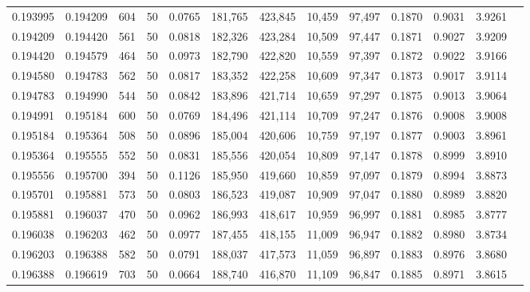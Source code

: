 \begin{tabular}{rrrrrrrrrrrrr}
0.193995 & 0.194209 &   604 &  50 &                                     0.0765 & 181,765 & 423,845 &  10,459 &  97,497 & 0.1870 & 0.9031 & 3.9261 \\
0.194209 & 0.194420 &   561 &  50 &                                     0.0818 & 182,326 & 423,284 &  10,509 &  97,447 & 0.1871 & 0.9027 & 3.9209 \\
0.194420 & 0.194579 &   464 &  50 &                                     0.0973 & 182,790 & 422,820 &  10,559 &  97,397 & 0.1872 & 0.9022 & 3.9166 \\
0.194580 & 0.194783 &   562 &  50 &                                     0.0817 & 183,352 & 422,258 &  10,609 &  97,347 & 0.1873 & 0.9017 & 3.9114 \\
0.194783 & 0.194990 &   544 &  50 &                                     0.0842 & 183,896 & 421,714 &  10,659 &  97,297 & 0.1875 & 0.9013 & 3.9064 \\
0.194991 & 0.195184 &   600 &  50 &                                     0.0769 & 184,496 & 421,114 &  10,709 &  97,247 & 0.1876 & 0.9008 & 3.9008 \\
0.195184 & 0.195364 &   508 &  50 &                                     0.0896 & 185,004 & 420,606 &  10,759 &  97,197 & 0.1877 & 0.9003 & 3.8961 \\
0.195364 & 0.195555 &   552 &  50 &                                     0.0831 & 185,556 & 420,054 &  10,809 &  97,147 & 0.1878 & 0.8999 & 3.8910 \\
0.195556 & 0.195700 &   394 &  50 &                                     0.1126 & 185,950 & 419,660 &  10,859 &  97,097 & 0.1879 & 0.8994 & 3.8873 \\
0.195701 & 0.195881 &   573 &  50 &                                     0.0803 & 186,523 & 419,087 &  10,909 &  97,047 & 0.1880 & 0.8989 & 3.8820 \\
0.195881 & 0.196037 &   470 &  50 &                                     0.0962 & 186,993 & 418,617 &  10,959 &  96,997 & 0.1881 & 0.8985 & 3.8777 \\
0.196038 & 0.196203 &   462 &  50 &                                     0.0977 & 187,455 & 418,155 &  11,009 &  96,947 & 0.1882 & 0.8980 & 3.8734 \\
0.196203 & 0.196388 &   582 &  50 &                                     0.0791 & 188,037 & 417,573 &  11,059 &  96,897 & 0.1883 & 0.8976 & 3.8680 \\
0.196388 & 0.196619 &   703 &  50 &                                     0.0664 & 188,740 & 416,870 &  11,109 &  96,847 & 0.1885 & 0.8971 & 3.8615 \\

\end{tabular}

